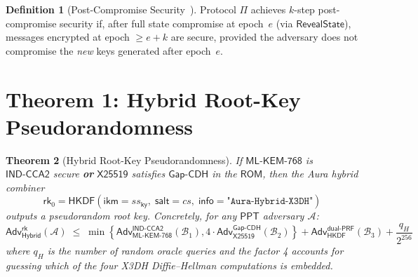 \documentclass[11pt,a4paper]{article}
\newtheorem{theorem}{Theorem}[section]
\theoremstyle{definition}
\newtheorem{definition}[theorem]{Definition}
\theoremstyle{remark}
\newcommand{\ppt}{\mathsf{PPT}}
\newcommand{\adv}{\mathsf{Adv}}
\newcommand{\advA}{\mathcal{A}}
\newcommand{\advB}{\mathcal{B}}
\newcommand{\HKDF}{\mathsf{HKDF}}
\renewcommand{\DH}{\mathsf{X25519}}
\newcommand{\KEM}{\mathsf{ML\text{-}KEM\text{-}768}}
\newcommand{\GapCDH}{\mathsf{Gap\text{-}CDH}}
\newcommand{\INDCCA}{\mathsf{IND\text{-}CCA2}}
\newcommand{\dualPRF}{\mathsf{dual\text{-}PRF}}
\newcommand{\ROM}{\mathsf{ROM}}
\newcommand{\rk}{\mathsf{rk}}
\begin{document}
\begin{definition}[Post-Compromise Security~\cite{cohn-gordon2020}]
\label{def:pcs}
Protocol $\Pi$ achieves $k$-step post-compromise security if, after full state
compromise at epoch~$e$ (via $\mathsf{RevealState}$), messages encrypted at
epoch $\geq e + k$ are secure, provided the adversary does not compromise the
\emph{new} keys generated after epoch~$e$.
\end{definition}


\section{Theorem 1: Hybrid Root-Key Pseudorandomness}
\label{sec:thm1}

\begin{theorem}[Hybrid Root-Key Pseudorandomness]
\label{thm:combiner}
If $\KEM$ is $\INDCCA$ secure \textbf{or} $\DH$ satisfies $\GapCDH$ in the
$\ROM$, then the Aura hybrid combiner
\[
  \rk_0 = \HKDF(\mathsf{ikm} = \mathit{ss}_{\mathsf{ky}},\;
    \mathsf{salt} = \mathit{cs},\;
    \mathsf{info} = \texttt{"Aura-Hybrid-X3DH"})
\]
outputs a pseudorandom root key.  Concretely, for any $\ppt$ adversary $\advA$:
\[
  \adv^{\mathsf{rk}}_{\mathsf{Hybrid}}(\advA)
  \;\leq\;
  \min\!\left\{
    \adv^{\INDCCA}_{\KEM}(\advB_1),
    4 \cdot \adv^{\GapCDH}_{\DH}(\advB_2)
  \right\}
  + \adv^{\dualPRF}_{\HKDF}(\advB_3)
  + \frac{q_H}{2^{256}}
\]
where $q_H$ is the number of random oracle queries and the factor 4 accounts
for guessing which of the four X3DH Diffie--Hellman computations is embedded.
\end{theorem}
\end{document}
